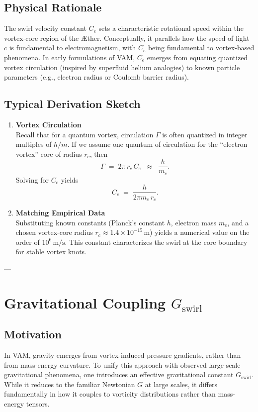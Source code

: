 \documentclass[aps,preprint,superscriptaddress]{revtex4-2}
\begin{document}
    \subsection{Physical Rationale}
    The swirl velocity constant \(C_e\) sets a characteristic rotational speed within the vortex-core region of the Æther. Conceptually, it parallels how the speed of light \(c\) is fundamental to electromagnetism, with \(C_e\) being fundamental to vortex-based phenomena. In early formulations of VAM, \(C_e\) emerges from equating quantized vortex circulation (inspired by superfluid helium analogies) to known particle parameters (e.g., electron radius or Coulomb barrier radius).

    \subsection{Typical Derivation Sketch}
    \begin{enumerate}
        \item \textbf{Vortex Circulation} \\
    Recall that for a quantum vortex, circulation \(\Gamma\) is often quantized in integer multiples of \(h/m\). If we assume one quantum of circulation for the “electron vortex” core of radius \(r_c\), then
    \[
        \Gamma \;=\; 2 \pi \,r_c \,C_e \;\;\approx\;\; \frac{h}{m_e}.
    \]
    Solving for \(C_e\) yields
    \[
        C_e
        \;=\;
        \frac{h}{2 \pi m_e \,r_c}.
    \]

        \item \textbf{Matching Empirical Data} \\
    Substituting known constants (Planck’s constant \(h\), electron mass \(m_e\), and a chosen vortex-core radius \(r_c\approx 1.4\times 10^{-15}\,\mathrm{m}\)) yields a numerical value on the order of \(10^6\,\mathrm{m/s}\). This constant characterizes the swirl at the core boundary for stable vortex knots.
    \end{enumerate}

    ---

    \section{Gravitational Coupling \(G_{\text{swirl}}\)}

    \subsection{Motivation}
    In VAM, gravity emerges from vortex-induced pressure gradients, rather than from mass-energy curvature. To unify this approach with observed large-scale gravitational phenomena, one introduces an effective gravitational constant \(G_{\text{swirl}}\). While it reduces to the familiar Newtonian \(G\) at large scales, it differs fundamentally in how it couples to vorticity distributions rather than mass-energy tensors.
\end{document}
